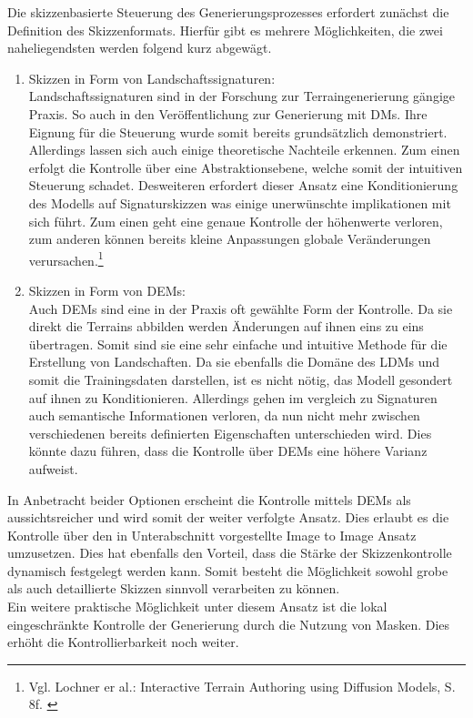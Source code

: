 Die skizzenbasierte Steuerung des Generierungsprozesses erfordert zunächst die Definition des Skizzenformats. Hierfür gibt es mehrere Möglichkeiten, die zwei naheliegendsten werden folgend kurz abgewägt. 
\begin{enumerate}
    \item Skizzen in Form von Landschaftssignaturen: \\
    Landschaftssignaturen sind in der Forschung zur Terraingenerierung gängige Praxis. So auch in den Veröffentlichung zur Generierung mit DMs. Ihre Eignung für die Steuerung wurde somit bereits grundsätzlich demonstriert. \\
    Allerdings lassen sich auch einige theoretische Nachteile erkennen. Zum einen erfolgt die Kontrolle über eine Abstraktionsebene, welche somit der intuitiven Steuerung schadet. Desweiteren erfordert dieser Ansatz eine Konditionierung des Modells auf Signaturskizzen was einige unerwünschte implikationen mit sich führt. Zum einen geht eine genaue Kontrolle der höhenwerte verloren, zum anderen können bereits kleine Anpassungen globale Veränderungen verursachen.\footnote{
        Vgl. Lochner er al.: Interactive Terrain Authoring using Diffusion Models, S. 8f. 
        \cite{lochner2023interactive}
    }
    \item Skizzen in Form von DEMs: \\
    Auch DEMs sind eine in der Praxis oft gewählte Form der Kontrolle. Da sie direkt die Terrains abbilden werden Änderungen auf ihnen eins zu eins übertragen. Somit sind sie eine sehr einfache und intuitive Methode für die Erstellung von Landschaften. Da sie ebenfalls die Domäne des LDMs und somit die Trainingsdaten darstellen, ist es nicht nötig, das Modell gesondert auf ihnen zu Konditionieren. Allerdings gehen im vergleich zu Signaturen auch semantische Informationen verloren, da nun nicht mehr zwischen verschiedenen bereits definierten Eigenschaften unterschieden wird.  Dies könnte dazu führen, dass die Kontrolle über DEMs eine höhere Varianz aufweist.
\end{enumerate}

In Anbetracht beider Optionen erscheint die Kontrolle mittels DEMs als aussichtsreicher und wird somit der weiter verfolgte Ansatz. Dies erlaubt es die Kontrolle über den in Unterabschnitt vorgestellte Image to Image Ansatz umzusetzen. Dies hat ebenfalls den Vorteil, dass die Stärke der Skizzenkontrolle dynamisch festgelegt werden kann. Somit besteht die Möglichkeit sowohl grobe als auch detaillierte Skizzen sinnvoll verarbeiten zu können. \\
Ein weitere praktische Möglichkeit unter diesem Ansatz ist die lokal eingeschränkte Kontrolle der Generierung durch die Nutzung von Masken. Dies erhöht die Kontrollierbarkeit noch weiter.


